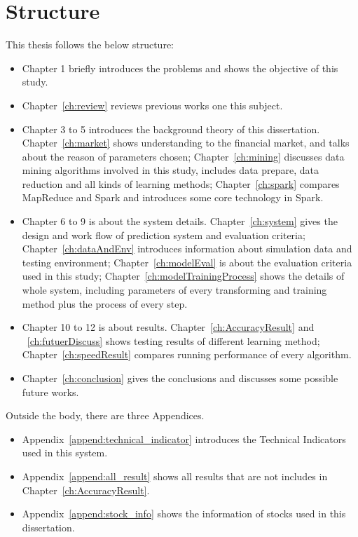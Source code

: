 \section{Structure}
This thesis follows the below structure:
\begin{itemize}
	\item Chapter 1 briefly introduces the problems and shows the objective of this study.
	\item Chapter~\ref{ch:review} reviews previous works one this subject.
	\item Chapter 3 to 5 introduces the background theory of this dissertation. Chapter~\ref{ch:market} shows understanding to the financial market, and talks about the reason of parameters chosen; Chapter~\ref{ch:mining} discusses data mining algorithms involved in this study, includes data prepare, data reduction and all kinds of learning methods; Chapter~\ref{ch:spark} compares MapReduce and Spark and introduces some core technology in Spark. 
	\item Chapter 6 to 9 is about the system details. Chapter~\ref{ch:system} gives the design and work flow of prediction system and evaluation criteria; Chapter~\ref{ch:dataAndEnv} introduces information about simulation data and testing environment; Chapter~\ref{ch:modelEval} is about the evaluation criteria used in this study; Chapter~\ref{ch:modelTrainingProcess} shows the details of whole system, including parameters of every transforming and training method plus the process of every step.
	\item Chapter 10 to 12 is about results.  Chapter~\ref{ch:AccuracyResult} and ~\ref{ch:futuerDiscuss} shows testing results of different learning method; Chapter~\ref{ch:speedResult} compares running performance of every algorithm.
	\item Chapter~\ref{ch:conclusion} gives the conclusions and discusses some possible future works.
\end{itemize}

Outside the body, there are three Appendices.
\begin{itemize}
	\item Appendix~\ref{append:technical_indicator} introduces the Technical Indicators used in this system.
	\item Appendix~\ref{append:all_result} shows all results that are not includes in Chapter~\ref{ch:AccuracyResult}.
	\item Appendix~\ref{append:stock_info} shows the information of stocks used in this dissertation.
\end{itemize}



